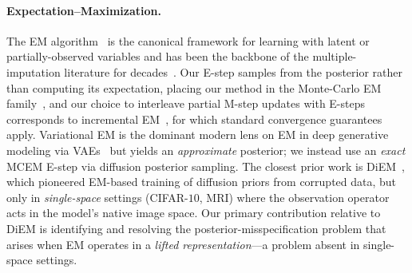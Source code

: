\documentclass{article}
\theoremstyle{plain}
\theoremstyle{definition}
\theoremstyle{remark}
\begin{document}
\paragraph{Expectation--Maximization.}
The EM algorithm~\citep{dempster1977em} is the canonical framework for learning with latent or partially-observed variables and has been the backbone of the multiple-imputation literature for decades~\citep{rubin1987multiple}. Our E-step samples from the posterior rather than computing its expectation, placing our method in the Monte-Carlo EM family~\citep{wei1990mcem}, and our choice to interleave partial M-step updates with E-steps corresponds to incremental EM~\citep{neal1998em}, for which standard convergence guarantees apply. Variational EM is the dominant modern lens on EM in deep generative modeling via VAEs~\citep{kingma2014vae} but yields an \emph{approximate} posterior; we instead use an \emph{exact} MCEM E-step via diffusion posterior sampling. The closest prior work is DiEM~\citep{rozet2024diem}, which pioneered EM-based training of diffusion priors from corrupted data, but only in \emph{single-space} settings (CIFAR-$10$, MRI) where the observation operator acts in the model's native image space. Our primary contribution relative to DiEM is identifying and resolving the posterior-misspecification problem that arises when EM operates in a \emph{lifted representation}---a problem absent in single-space settings.
\end{document}
